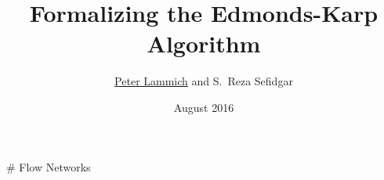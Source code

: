 \documentclass[fleqn]{beamer}
\title{Formalizing the Edmonds-Karp Algorithm}
\author[Peter Lammich]{\underline{Peter Lammich} and S.~Reza Sefidgar}
\institute[TUM] %
{ TU M\"unchen %
}
\date {August 2016}
\begin{document}
% 

\begin{frame}
  \titlepage
\end{frame}

{

  \def\basicnet{
    \tikzstyle{nd}=[shape=circle,draw, minimum size = 5mm]
    \node[nd] (s) {s};
    \node[nd] (a) [above right of = s] {a};
    \node[nd] (b) [below right of = s] {b};
    \node[nd] (c) [right of = a] {c};
    \node[nd] (d) [right of = b] {d};
    \node[nd] (t) [below right of = c] {t};
  }
  \def\capedges{
    \tikzstyle{lab}=[text=capacity]
    \draw[->] (s) to node[lab] {3} (a);
    \draw[->] (s) to node[lab] {5} (b);
    \draw[->] (a) to node[lab] {6} (c);
    \draw[->] (b) to node[lab] {3} (d);
    \draw[->] (c) to node[lab] {4} (t);
    \draw[->] (d) to node[lab] {4} (t);

    \draw[->] (a) to node[lab] {3} (d);
  }
  \def\flowa{
    \draw[dflow,line width = 3pt] (s) to node[flow] {3} (a);
    \draw[dflow,line width = 3pt] (a) to node[flow] {3} (d);
    \draw[dflow,line width = 3pt] (d) to node[flow] {3} (t);
  }
  \def\augpatha{
    \draw[aug] (s) to (b);
    \draw[aug] (b) to (d);
    \draw[aug] (d) to (t);
  }
  \def\flowb{
    \draw[dflow,line width = 3pt] (s) to node[flow] {3} (a);
    \draw[dflow,line width = 3pt] (a) to node[flow] {3} (d);
    \draw[dflow,line width = 4pt] (d) to node[flow] {4} (t);
    \draw[dflow,line width = 1pt] (s) to node[flow] {1} (b);
    \draw[dflow,line width = 1pt] (b) to node[flow] {1} (d);
  }
  \def\augpathb{
    \draw[aug] (s) to (b);
    \draw[aug] (b) to (d);
    \draw[aug] (d) to (a);
    \draw[aug] (a) to (c);
    \draw[aug] (c) to (t);
  }
  \def\flowc{
    \draw[dflow,line width = 3pt] (s) to node[flow] {3} (a);
    \draw[dflow,line width = 1pt] (a) to node[flow] {1} (d);
    \draw[dflow,line width = 4pt] (d) to node[flow] {4} (t);
    \draw[dflow,line width = 3pt] (s) to node[flow] {3} (b);
    \draw[dflow,line width = 3pt] (b) to node[flow] {3} (d);

    \draw[dflow,line width = 2pt] (a) to node[flow] {2} (c);
    \draw[dflow,line width = 2pt] (c) to node[flow] {2} (t);
  }


# Flow Networks
  \begin{minipage}{.49\textwidth}
\end{minipage}}
\end{document}
